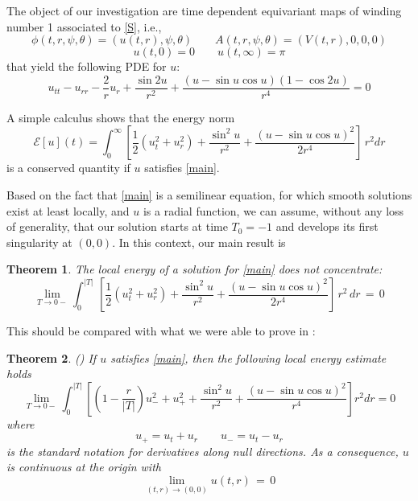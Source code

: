 \documentclass{amsart}
\newtheorem{theorem}{Theorem}[section]
\begin{document}
The object of our investigation are time dependent equivariant maps of winding number 1 associated to \eqref{S}, i.e.,
\[
\phi(t,r,\psi, \theta)= (u(t,r),\psi, \theta)\qquad A(t,r,\psi,
\theta)=(V(t,r),0,0,0)
\]
\[
u(t,0)=0  \qquad u(t,\infty)= \pi
\]
that yield the following PDE for $u$:
\begin{equation}
u_{tt} - u_{rr} - \frac 2r u_r + \frac{\sin 2u}{r^2} +
\frac{(u-\sin u \cos u)(1- \cos 2u)}{r^4} = 0\label{main}
\end{equation}

A simple calculus shows that the energy norm
\begin{equation}
\mathcal{E}[u](t)=\int_0^\infty \left[\frac{1}{2}\left(u_t^2+u_r^2\right)+
\frac{\sin ^2 u}{r^2} +\frac{(u-\sin u \cos u)^2}{2r^4}
\right]\,r^2 dr \label{tote}
\end{equation}
is a conserved quantity if $u$ satisfies \eqref{main}.

Based on the fact that  \eqref{main} is a semilinear equation, for which smooth solutions exist at least locally, and $u$ is a radial function, we can assume, without any loss of generality, that our solution starts at time $T_0= -1$ and develops its first singularity at $(0,0)$. In this
context, our main result is

\begin{theorem}
The local energy of a solution for \eqref{main} does not concentrate:
\begin{equation}
\lim_{T\to 0-} \int_0^{|
T|}\,\left[\frac{1}{2}\left(u_t^2+u_r^2\right)+
\frac{\sin ^2 u}{r^2} +\frac{(u-\sin u \cos u)^2}{2r^4}
\right]\, r^2\,dr\,=\,0\label{en}
\end{equation}
\label{local}
\end{theorem}

This should be compared with what we were able to prove in \cite{GR1}:

\begin{theorem}
(\cite{GR1}) If $u$ satisfies \eqref{main}, then the following local energy estimate holds
\begin{equation}
\lim_{T\to 0-} \int_0^{|
T|}\left[ \left(1-\frac{r}{|T|}\right)u_-^2+u_+^2 +\frac{\sin^2u}{r^2} +\frac{(u-\sin
u \cos u)^2}{r^4}\right] r^2 dr = 0\label{loce}
\end{equation}
where
\[
u_{+}=u_t+u_r \qquad u_{-}=u_t-u_r
\]
is the standard notation for derivatives along null directions. As a consequence, $u$ is continuous at the origin with
\[
\lim_{(t,r)\to (0,0)} u(t,r)\,=\, 0
\]
\label{cont}
\end{theorem}
\end{document}
